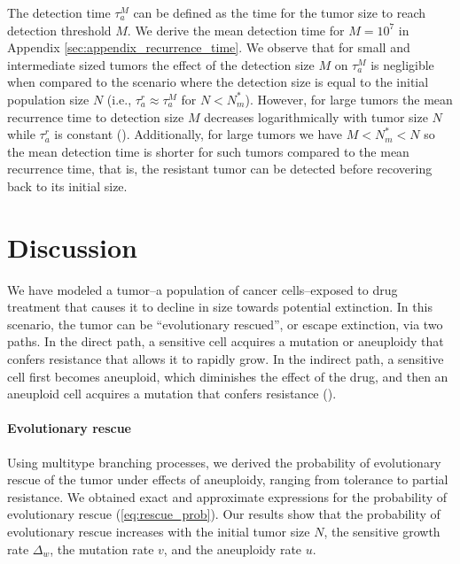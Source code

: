 \documentclass[12pt]{extarticle}
\begin{document}
The detection time $\tau_a^{M}$ can be defined as the time for the tumor size to reach detection threshold $M$. We derive the mean detection time for $M=10^7$ in Appendix \ref{sec:appendix_recurrence_time}. We observe that  for small and intermediate sized tumors the effect of the detection size $M$ on $\tau_a^{M}$ is negligible when compared to the scenario where the detection size is equal to the initial population size $N$ (i.e., $\tau_a^r\approx\tau_a^{M}$ for $N<N_m^*$). 
However, for large tumors the mean recurrence time to detection size $M$ decreases logarithmically with tumor size $N$ while $\tau_a^{r}$ is constant (). Additionally, for large tumors we have $M<N_m^*<N$ so the mean detection time is shorter for such tumors compared to the mean recurrence time, that is, the resistant tumor can be detected before recovering back to its initial size.




\section*{Discussion}

We have modeled a tumor--a population of cancer cells--exposed to drug treatment that causes it to decline in size towards potential extinction.
In this scenario, the tumor can be ``evolutionary rescued'', or escape extinction, via two paths.
In the direct path, a sensitive cell acquires a mutation or aneuploidy that confers resistance that allows it to rapidly grow.
In the indirect path, a sensitive cell first becomes aneuploid, which diminishes the effect of the drug, and then an aneuploid cell acquires a mutation that confers resistance (). 


\paragraph{Evolutionary rescue}
Using multitype branching processes, we derived the probability of evolutionary rescue of the tumor under effects of aneuploidy, ranging from tolerance to partial resistance.
We obtained exact and approximate expressions for the probability of evolutionary rescue (\cref{eq:rescue_prob}). 
Our results show that the probability of evolutionary rescue increases with the initial tumor size $N$, the sensitive growth rate $\Delta_w$, the mutation rate $v$, and the aneuploidy rate $u$.
\end{document}
